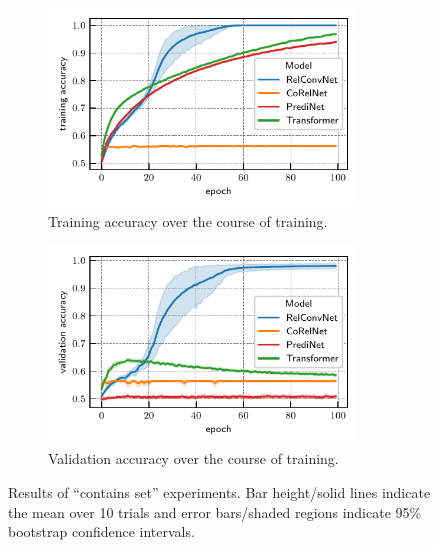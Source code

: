 \begin{figure}[ht]
    \begin{subfigure}[t]{0.45\textwidth}
        \centering
        \includegraphics[width=0.9\textwidth]{figs/experiments/contains_set_training_curves_trainacc.pdf}
        \vskip-5pt
        \caption{Training accuracy over the course of training.}\label{fig:contains_set_training_curves_trainacc}
    \end{subfigure}
    \begin{subfigure}[t]{0.45\textwidth}
        \centering
        \includegraphics[width=0.9\textwidth]{figs/experiments/contains_set_training_curves_valacc.pdf}
        \vskip-5pt
        \caption{Validation accuracy over the course of training.}\label{fig:contains_set_training_curves_valacc}
    \end{subfigure}
    \caption{Results of ``contains set'' experiments. Bar height/solid lines indicate the mean over 10 trials and error bars/shaded regions indicate 95\% bootstrap confidence intervals.}\label{fig:contains_set_training_curves}
    \vskip-12.5pt
\end{figure}


